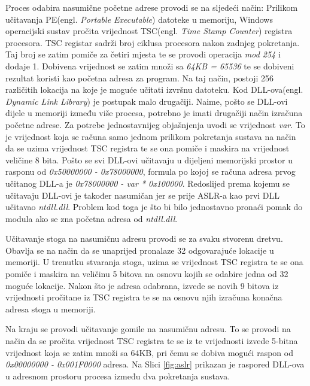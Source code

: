 \documentclass[times, utf8, diplomski, numeric]{fer}
\begin{document}
Proces odabira nasumične početne adrese provodi se na sljedeći način: Prilikom učitavanja PE(engl. \emph{Portable Executable}) datoteke u memoriju, Windows operacijski sustav pročita vrijednost TSC(engl. \emph{Time Stamp Counter}) registra procesora. TSC registar sadrži broj ciklusa procesora nakon zadnjeg pokretanja. Taj broj se zatim pomiče za četiri mjesta te se provodi operacija \emph{mod 254} i dodaje 1. Dobivena vrijednost se zatim množi sa \emph{64KB = 65536} te se dobiveni rezultat koristi kao početna adresa za program. Na taj način, postoji 256 različitih lokacija na koje je moguće učitati izvršnu datoteku. Kod DLL-ova(engl. \emph{Dynamic Link Library}) je postupak malo drugačiji. Naime, pošto se DLL-ovi dijele u memoriji između više procesa, potrebno je imati drugačiji način izračuna početne adrese. Za potrebe jednostavnijeg objašnjenja uvodi se vrijednost \emph{var}. To je vrijednost koja se računa samo jednom prilikom pokretanja sustava na način da se uzima vrijednost TSC registra te se ona pomiče i maskira na vrijednost veličine 8 bita. Pošto se svi DLL-ovi učitavaju u dijeljeni memorijski prostor u rasponu od \emph{0x50000000 - 0x78000000}, formula po kojoj se računa adresa prvog učitanog DLL-a je \emph{0x78000000 - var * 0x100000}. Redoslijed prema kojemu se učitavaju DLL-ovi je također nasumičan jer se prije ASLR-a kao prvi DLL učitavao \emph{ntdll.dll}. Problem kod toga je što bi bilo jednostavno pronaći pomak do modula ako se zna početna adresa od \emph{ntdll.dll}. 

Učitavanje stoga na nasumičnu adresu provodi se za svaku stvorenu dretvu. Obavlja se na način da se unaprijed pronalaze 32 odgovarajuće lokacije u memoriji. U trenutku stvaranja stoga, uzima se vrijednost TSC registra te se ona pomiče i maskira na veličinu 5 bitova na osnovu kojih se odabire jedna od 32 moguće lokacije. Nakon što je adresa odabrana, izvede se novih 9 bitova iz vrijednosti pročitane iz TSC registra te se na osnovu njih izračuna konačna adresa stoga u memoriji.

Na kraju se provodi učitavanje gomile na nasumičnu adresu. To se provodi na način da se pročita vrijednost TSC registra te se iz te vrijednosti izvede 5-bitna vrijednost koja se zatim množi sa 64KB, pri čemu se dobiva mogući raspon od \emph{0x00000000 - 0x001F0000} adresa. Na Slici \ref{fig:aslr} prikazan je raspored DLL-ova u adresnom prostoru procesa između dva pokretanja sustava.
\end{document}
